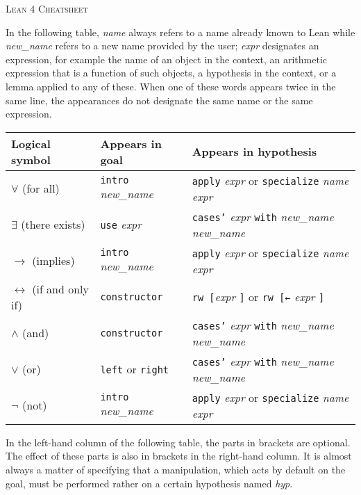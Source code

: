 \documentclass[a4paper]{article}
\newcommand{\lean}[1]{{\tt #1}}
\newcommand{\nv}{\textit{new\_name} }
\newcommand{\nom}{\textit{name} }
\newcommand{\expr}{\textit{expr} }
\newcommand{\hyp}{\textit{hyp}\xspace}
\begin{document}
\pagestyle{empty}
\begin{center}
 \large\textsc{Lean 4 Cheatsheet}
\end{center}

In the following table,
\nom always refers to a name already known to Lean
while \nv refers to a new name provided by the user;
\expr designates an expression,
for example the name of an object in the context,
an arithmetic expression that is a function of such objects,
a hypothesis in the context,
or a lemma applied to any of these.
When one of these words appears twice in the same line,
the appearances do not designate the same name or
the same expression.

\begin{center}
\setlength\tabcolsep{1.1cm}
\def\arraystretch{1.5}
\begin{tabular}{@{}lll@{}}
  \toprule
  Logical symbol & Appears in goal & Appears in hypothesis \\
  \midrule
 $\forall$ (for all) & \lean{intro} \nv & \lean{apply} \expr or \lean{specialize} \nom \expr  \\
 $\exists$ (there exists) & \lean{use} \expr & \lean{cases'} \expr \lean{with} \nv \nv \\
 $\to$ (implies) & \lean{intro} \nv & \lean{apply} \expr or \lean{specialize} \nom \expr \\
 $\leftrightarrow$ (if and only if) & \lean{constructor}  & \lean{rw [}\expr\lean{]} or \lean{rw [←} \expr\lean{]}\\
 $\land$ (and) & \lean{constructor} & \lean{cases'} \expr \lean{with} \nv \nv \\
 $\lor$ (or) & \lean{left} or \lean{right} & \lean{cases'} \expr \lean{with} \nv \nv \\
 $\lnot$ (not) & \lean{intro} \nv & \lean{apply} \expr or \lean{specialize} \nom \expr  \\
  \bottomrule
\end{tabular}
\end{center}

\medskip
\noindent
In the left-hand column of the following table,
the parts in brackets are optional.
The effect of these parts is also in brackets in the right-hand column.
It is almost always a matter of specifying that a manipulation,
which acts by default on the goal,
must be performed rather on a certain hypothesis named \hyp.
\end{document}
